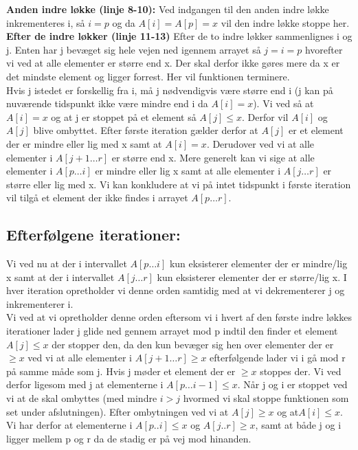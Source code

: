 \documentclass[10pt,a4paper,danish]{article}
\begin{document}
\textbf{Anden indre løkke (linje 8-10):}
Ved indgangen til den anden indre løkke inkrementeres i, så $i=p$ og da $A[i] = A[p] = x$ vil den indre løkke stoppe her.
\\

\textbf{Efter de indre løkker (linje 11-13)}
Efter de to indre løkker sammenlignes i og j.
Enten har j bevæget sig hele vejen ned igennem arrayet så $j=i=p$ hvorefter vi ved at alle elementer er større end x. Der skal derfor ikke gøres mere da x er det mindste element og ligger forrest. Her vil funktionen terminere.
\\

Hvis j istedet er forskellig fra i, må j nødvendigvis være større end i (j kan på nuværende tidspunkt ikke være mindre end i da $A[i] = x$).
Vi ved så at $A[i] = x$ og at j er stoppet på et element så $A[j] \leq x$. Derfor vil $A[i]$ og $A[j]$ blive ombyttet.
Efter første iteration gælder derfor at $A[j]$ er et element der er mindre eller lig med x samt at $A[i] = x$. Derudover ved vi at alle elementer i $A[j+1 \ldots r]$ er større end x.
Mere generelt kan vi sige at alle elementer i $A[p \ldots i]$ er mindre eller lig x samt at alle elementer i $A[j \ldots r]$ er større eller lig med x.
Vi kan konkludere at vi på intet tidspunkt i første iteration vil tilgå et element der ikke findes i arrayet $A[p \ldots r]$.


\subsection{Efterfølgene iterationer:}
\label{sec:eft-it}
Vi ved nu at der i intervallet $A[p \ldots i]$ kun eksisterer elementer der er mindre/lig x samt at der i intervallet $A[j\ldots r]$ kun eksisterer elementer der er større/lig x. 
I hver iteration opretholder vi denne orden samtidig med at vi dekrementerer j og inkrementerer i.
\\

Vi ved at vi opretholder denne orden eftersom vi i hvert af den første indre løkkes iterationer lader j glide ned gennem arrayet mod p indtil den finder et element $A[j] \leq x$ der stopper den, da den kun bevæger sig hen over elementer der er $\geq x$ ved vi at alle elementer i $A[j+1\ldots r] \geq x$
efterfølgende lader vi i gå mod r på samme måde som j. Hvis j møder et element der er $\geq x$ stoppes der. Vi ved derfor ligesom med j at elementerne i $A[p\ldots i-1] \leq x$. Når j og i er stoppet ved vi at de skal ombyttes (med mindre  $i>j$ hvormed vi skal stoppe funktionen som set under afslutningen). Efter ombytningen ved vi at $A[j] \geq x$ og at$ A[i] \leq x$. Vi har derfor at elementerne i $A[p..i] \leq x$ og $A[j..r] \geq x$, samt at både j og i ligger mellem p og r da de stadig er på vej mod hinanden.
\end{document}
